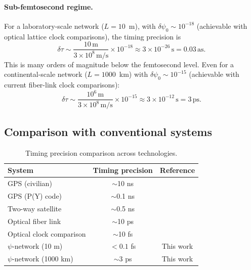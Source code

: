 \documentclass[aps,prd,twocolumn,superscriptaddress,nofootinbib]{revtex4-2}
\newcommand{\as}{\,\mathrm{as}}
\begin{document}
\paragraph{Sub-femtosecond regime.}
For a laboratory-scale network ($L = 10$~m), with
$\delta\psi_0 \sim 10^{-18}$ (achievable with optical lattice clock
comparisons), the timing precision is
\begin{equation}\label{eq:subfemto}
\delta\tau \sim \frac{10\,\mathrm{m}}{3\times10^8\,\mathrm{m/s}}
\times 10^{-18} \approx 3 \times 10^{-26}\,\mathrm{s} = 0.03\as.
\end{equation}
This is many orders of magnitude below the femtosecond level. Even for a
continental-scale network ($L = 1000$~km) with $\delta\psi_0 \sim 10^{-15}$
(achievable with current fiber-link clock comparisons):
\begin{equation}
\delta\tau \sim \frac{10^6\,\mathrm{m}}{3\times10^8\,\mathrm{m/s}}
\times 10^{-15} \approx 3 \times 10^{-12}\,\mathrm{s} = 3\,\mathrm{ps}.
\end{equation}

\subsection{Comparison with conventional systems}\label{sec:comparison}

\begin{table}[t]
\caption{Timing precision comparison across technologies.}
\label{tab:timing-comparison}
\begin{ruledtabular}
\begin{tabular}{lcc}
System & Timing precision & Reference \\
\hline
GPS (civilian) & $\sim$10 ns & \cite{Kaplan2017} \\
GPS (P(Y) code) & $\sim$0.1 ns & \cite{Kaplan2017} \\
Two-way satellite & $\sim$0.5 ns & \cite{Kirchner1999} \\
Optical fiber link & $\sim$10 ps & \cite{Lisdat2016} \\
Optical clock comparison & $\sim$10 fs & \cite{Bothwell2022} \\
$\psi$-network (10 m) & $< 0.1$ fs & This work \\
$\psi$-network (1000 km) & $\sim$3 ps & This work \\
\end{tabular}
\end{ruledtabular}
\end{table}
\end{document}
